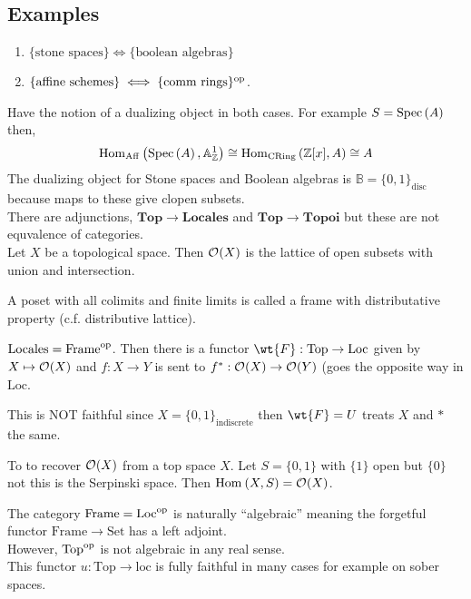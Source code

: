 \documentclass[12pt]{article}
\begin{document}
\subsection{Examples}

\begin{enumerate}
\item $\{ \text{stone spaces} \} \iff \{ \text{boolean algebras} \}$
\item $\{ \text{affine schemes} \} \iff \{ \text{comm rings} \}^{\mathrm{op}}$.
\end{enumerate}

Have the notion of a dualizing object in both cases. For example $S = \mathrm{Spec}\left( A \right)$ then,
\[ \mathrm{Hom}_{\mathrm{Aff}} \left( \mathrm{Spec}\left( A \right), \mathbb{A}^1_{\mathbb{Z}} \right) \cong \mathrm{Hom}_{\mathrm{CRing}} \left( \mathbb{Z}[x], A \right) \cong A \]
The dualizing object for Stone spaces and Boolean algebras is $\mathbb{B} = \{ 0, 1 \}_{\text{disc}}$ because maps to these give clopen subsets. 
\bigskip\\
There are adjunctions, $\mathbf{Top} \to \mathbf{Locales}$ and $\mathbf{Top} \to \mathbf{Topoi}$ but these are not equvalence of categories. 
\bigskip\\
Let $X$ be a topological space. Then $\mathcal{O}_{}(X)$ is the lattice of open subsets with union and intersection. 


\begin{defn}
A poset with all colimits and finite limits is called a frame with distributative property (c.f. distributive lattice).
\end{defn}

\begin{defn}
$\mathrm{Locales} = \mathrm{Frame}^{\mathrm{op}}$. Then there is a functor $\wt{F} : \mathrm{Top} \to \mathrm{Loc}$ given by $X \mapsto \mathcal{O}_{}(X)$ and $f : X \to Y$ is sent to $f^* : \mathcal{O}_{}(X) \to \mathcal{O}_{}(Y)$ (goes the opposite way in $\mathrm{Loc}$. 
\end{defn}

\begin{rmk}
This is NOT faithful since $X = \{ 0, 1 \}_{\text{indiscrete}}$ then $\wt{F}=U$ treats $X$ and $*$ the same.
\end{rmk}

\begin{rmk}
To to recover $\mathcal{O}_{}(X)$ from a top space $X$. Let $S = \{ 0, 1 \}$ with $\{ 1 \}$ open but $\{ 0 \}$ not this is the Serpinski space. Then $\mathrm{Hom}_{} \left( X, S \right) = \mathcal{O}_{}(X)$.  
\end{rmk}

\begin{rmk}
The category $\mathrm{Frame} = \mathrm{Loc}^{\mathrm{op}}$ is naturally ``algebraic'' meaning the forgetful functor $\mathrm{Frame} \to \mathrm{Set}$ has a left adjoint.
\bigskip\\
However, $\mathrm{Top}^{\mathrm{op}}$ is not algebraic in any real sense.
\bigskip\\
This functor $u : \mathrm{Top} \to \mathrm{loc}$ is fully faithful in many cases for example on sober spaces.
\end{rmk}
\end{document}
